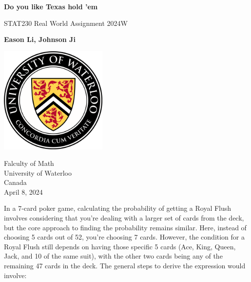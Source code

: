 \documentclass{article}
\begin{document}
\begin{titlepage}
    \begin{center}
        \vspace*{0.6cm}
            
        \Huge
        \textbf{Do you like Texas hold 'em}
            
        \vspace{0.5cm}
        \LARGE
        STAT230 Real World Assignment 2024W
            
        \vspace{1.5cm}
            
        \textbf{Eason Li, Johnson Ji}
            
        \vspace{3.6cm}
        
        \begin{center}
            \includegraphics[width = 0.4\textwidth]{UofLoo.png}
        \end{center}

        \vspace{0.4cm}
            
        \Large
        Falculty of Math \\
        University of Waterloo \\
        Canada \\
        April 8, 2024
    \end{center}
\end{titlepage}

\newpage

In a 7-card poker game, calculating the probability of getting a Royal Flush involves considering that you're dealing with a larger set of cards from the deck, but the core approach to finding the probability remains similar. Here, instead of choosing 5 cards out of 52, you're choosing 7 cards. However, the condition for a Royal Flush still depends on having those specific 5 cards (Ace, King, Queen, Jack, and 10 of the same suit), with the other two cards being any of the remaining 47 cards in the deck. The general steps to derive the expression would involve:
\end{document}
